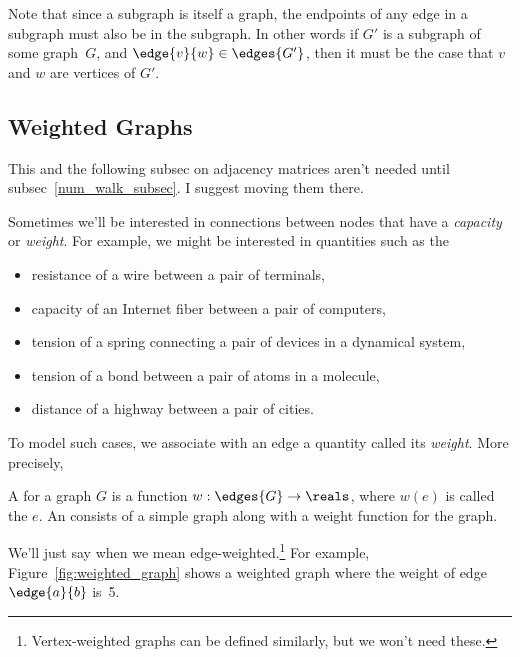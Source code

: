 \begin{editingnotes}
Note that since a subgraph is itself a graph, the endpoints of any
edge in a subgraph must also be in the subgraph.  In other words if
$G'$ is a subgraph of some graph~$G$, and $\edge{v}{w} \in
\edges{G'}$, then it must be the case that $v$ and $w$ are vertices of
$G'$.
\end{editingnotes}

\subsection{Weighted Graphs}
\begin{editingnotes}
This and the following subsec on adjacency matrices aren't needed until
subsec~\ref{num_walk_subsec}.  I suggest moving them there.

\end{editingnotes}

Sometimes we'll be interested in connections between nodes that have a
\emph{capacity} or \emph{weight}.  For example, we might be interested in
quantities such as the
\begin{itemize}

\item resistance of a wire between a pair of terminals, 

\item capacity of an Internet fiber between a pair of computers,

\item tension of a spring connecting a pair of devices in a dynamical system,

\item tension of a bond between a pair of atoms in a molecule,

\item distance of a highway between a pair of cities.

\end{itemize}
To model such cases, we associate with an edge a quantity called its
\emph{weight}.  More precisely,
\begin{definition}
  A  for a graph $G$ is a function $w: \edges{G} \to
  \reals$, where $w(e)$ is called the  $e$.
An  consists of a simple graph along with
a weight function for the graph.
\end{definition}
We'll just say  when we mean
edge-weighted.\footnote{Vertex-weighted graphs can be defined similarly,
  but we won't need these.}
For example, Figure~\ref{fig:weighted_graph} shows a weighted graph
where the weight of edge $\edge{a}{b}$ is~5.


